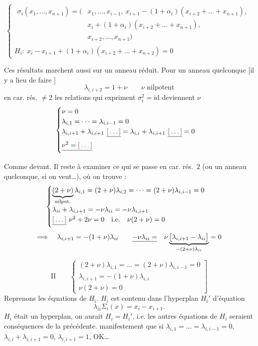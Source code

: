 \documentclass[11pt,a4paper]{article}
\begin{document}
\[
\begin{cases}
\begin{aligned}
\sigma_i(x_1,\dots,x_{n+1}) = \bigl(&x_1,\dots,x_{i-1},\ x_{i+1}-(1+\alpha_i)(x_{i+2}+\dots+x_{n+1}), \\
&x_i+(1+\alpha_i)(x_{i+2}+\dots+x_{n+1}), \\
&x_{i+2},\dots,x_{n+1}\bigr)
\end{aligned} \\[2ex]
H_i :\ x_i-x_{i+1}+(1+\alpha_i)(x_{i+2}+\dots+x_{n+2}) = 0
\end{cases}
\]

Ces résultats marchent aussi sur un anneau réduit. Pour un anneau quelconque [il y a lieu de faire ]
\[
\lambda_{i,i+2} = 1+\nu \qquad \nu \text{ nilpotent}
\]
 en car. rés. $\neq 2$ les relations qui expriment $\sigma_i^2=\mathrm{id}$ deviennent $\nu$
\[
\begin{cases}
\nu = 0 \\
\lambda_{i,1} = \dots = \lambda_{i,i-1} = 0 \\
\lambda_{i,i+1}+\lambda_{i,i+1}\ \struck{\ill{}} = \lambda_{i,i}+\lambda_{i,i+1}\ \struck{\ill{}} = 0 \\
\struck{\nu^2=\ill{}}
\end{cases}
\]

Comme devant. Il reste à examiner ce qui se passe en car. rés.~$2$ (ou un anneau quelconque, si on veut\ldots), où on trouve :
\[
\begin{cases}
\underbrace{(2+\nu)}_{\text{nilpot.}}\lambda_{i,1} = (2+\nu)\lambda_{i,2} = \dots = (2+\nu)\lambda_{i,i-1} = 0 \\
\lambda_{ii}+\lambda_{i,i+1} = -\nu\lambda_{ii} = -\nu\lambda_{i,i+1} \\
\struck{\ill{}}\ \nu^2+2\nu = 0 \quad \text{i.e.}\quad \nu(2+\nu) = 0
\end{cases}
\]
\[
\Longrightarrow\quad \lambda_{i,i+1} = -(1+\nu)\lambda_{ii} \qquad \struck{-\nu\lambda_{ii}=}\quad \nu\underbrace{\bigl[\lambda_{i,i+1}-\lambda_{ii}\bigr]}_{-(2+\nu)\lambda_{ii}} = 0
\]

\[
\text{II}\qquad
\left.\begin{cases}
(2+\nu)\lambda_{i,1} = \dots = (2+\nu)\lambda_{i,i-1} = 0 \\
\lambda_{i,i+1} = -(1+\nu)\lambda_{i,i} \\
\nu(2+\nu) = 0
\end{cases}\right]
\]
Reprenons les équations de $H_i$. $H_i$ est contenu dans l'hyperplan $H_i'$ d'équation
\[
\lambda_{ii}\Sigma_i(x) = x_i-x_{i+1} .
\]
  $H_i$ était un hyperplan, on aurait $H_i=H_i'$, i.e. les autres équations de $H_i$ seraient conséquences de la précédente.  manifestement que si $\lambda_{i,1}=\dots=\lambda_{i,i-1}=0$, $\lambda_{i,i}+\lambda_{i,i+1}=0$, $\lambda_{i,i+1}=1$, OK\ldots
\end{document}
